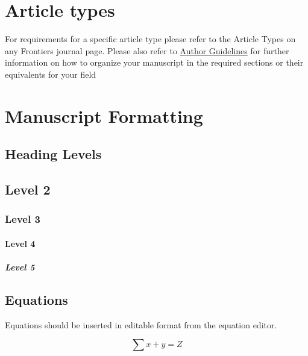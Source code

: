 \documentclass[utf8]{frontiersSCNS} %
\begin{document}
\section{Article types}

For requirements for a specific article type please refer to the Article Types on any Frontiers journal page. Please also refer to  \href{http://home.frontiersin.org/about/author-guidelines#Sections}{Author Guidelines} for further information on how to organize your manuscript in the required sections or their equivalents for your field


\section{Manuscript Formatting}

\subsection{Heading Levels}


\subsection{Level 2}
\subsubsection{Level 3}
\paragraph{Level 4}
\subparagraph{Level 5}

\subsection{Equations}
Equations should be inserted in editable format from the equation editor.

\begin{equation}
\sum x+ y =Z\label{eq:01}
\end{equation}
\end{document}
